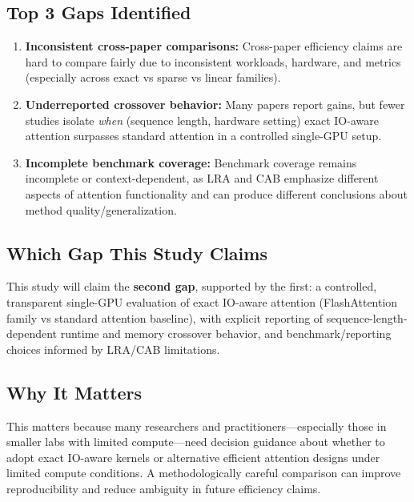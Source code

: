 \documentclass[12pt, a4paper]{article}
\begin{document}
\subsection{Top 3 Gaps Identified}

\begin{enumerate}
    \item \textbf{Inconsistent cross-paper comparisons:} Cross-paper efficiency claims are hard to compare fairly due to inconsistent workloads, hardware, and metrics (especially across exact vs sparse vs linear families).
    \item \textbf{Underreported crossover behavior:} Many papers report gains, but fewer studies isolate \emph{when} (sequence length, hardware setting) exact IO-aware attention surpasses standard attention in a controlled single-GPU setup.
    \item \textbf{Incomplete benchmark coverage:} Benchmark coverage remains incomplete or context-dependent, as LRA and CAB emphasize different aspects of attention functionality and can produce different conclusions about method quality/generalization.
\end{enumerate}

\subsection{Which Gap This Study Claims}

This study will claim the \textbf{second gap}, supported by the first: a controlled, transparent single-GPU evaluation of exact IO-aware attention (FlashAttention family vs standard attention baseline), with explicit reporting of sequence-length-dependent runtime and memory crossover behavior, and benchmark/reporting choices informed by LRA/CAB limitations.

\subsection{Why It Matters}

This matters because many researchers and practitioners---especially those in smaller labs with limited compute---need decision guidance about whether to adopt exact IO-aware kernels or alternative efficient attention designs under limited compute conditions. A methodologically careful comparison can improve reproducibility and reduce ambiguity in future efficiency claims.


\end{document}
